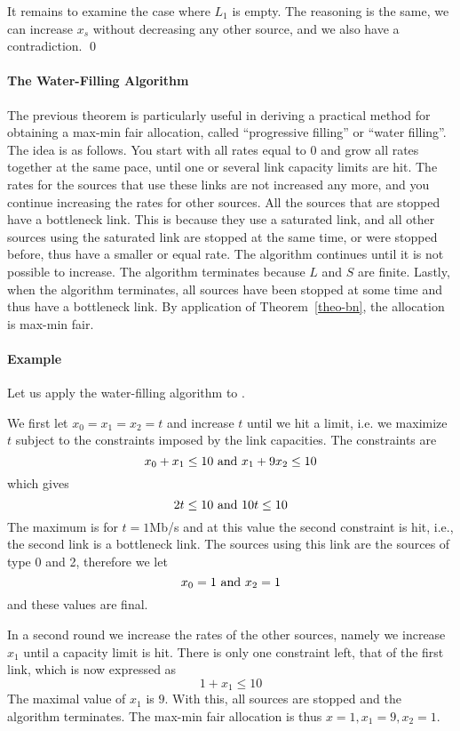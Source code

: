 It remains to examine the case where $L_1$ is empty. The
reasoning is the same, we can increase $x_s$ without
decreasing any other source, and we also have a contradiction.
\qed

\paragraph{The Water-Filling Algorithm}

The previous theorem is particularly useful in deriving a
practical method for obtaining a max-min fair allocation,
called ``progressive filling'' or ``water filling''.  The idea is as follows.  You
start with all rates equal to 0 and grow all rates together at
the same pace, until one or several link capacity limits are
hit.  The rates for the sources that use these links are not
increased any more, and you continue increasing the rates for
other sources.  All the sources that are stopped have a
bottleneck link.  This is because they use a saturated link,
and all other sources using the saturated link are stopped at
the same time, or were stopped before, thus have a smaller or
equal rate.  The algorithm continues until it is not possible
to increase.  The algorithm terminates because $L$ and $S$ are
finite.  Lastly, when the algorithm terminates, all sources
have been stopped at some time and thus have a bottleneck
link.  By application of Theorem~\ref{theo-bn}, the allocation
is max-min fair.

\paragraph{Example}
Let us apply the water-filling algorithm to .

We first let $x_{0}=x_1=x_2=t$ and increase $t$ until we hit a limit, i.e. we maximize $t$ subject to the constraints imposed by the link capacities. The constraints are
$$
x_0+x_1\leq 10\textrm{ and } x_1 +9x_2\leq 10$$
which gives
$$
2t\leq 10 \textrm{ and } 10t\leq 10$$
The maximum is for $t=1$Mb/s and at this value the second constraint is hit, i.e., the second link is a bottleneck link. The sources using this link are the sources of type 0 and 2, therefore we let
$$
x_0=1\textrm{ and } x_2=1
$$
and these values are final.

In a second round we increase the rates of the other sources, namely we increase $x_1$ until a capacity limit is hit. There is only one constraint left, that of the first link, which is now expressed as
$$1 + x_1\leq 10
$$
The maximal value of $x_1$ is $9$. With this, all sources are stopped and the algorithm terminates. The max-min fair allocation is thus $x=1, x_1=9, x_2=1$.

